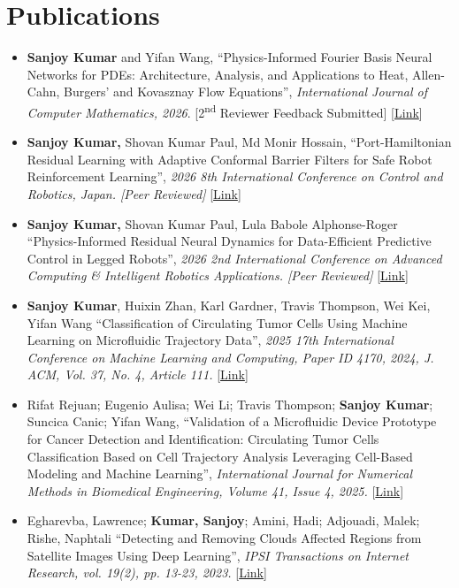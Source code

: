 \documentclass[10pt,letterpaper]{article}
\newcommand{\lk}[2]{[\href{#1}{#2}]}
\begin{document}
\section{Publications}
\begin{itemize}
  \item \textbf{Sanjoy Kumar} and Yifan Wang, ``Physics-Informed Fourier Basis Neural Networks for PDEs: Architecture, Analysis, and Applications to Heat, Allen-Cahn, Burgers' and Kovasznay Flow Equations'', \textit{International Journal of Computer Mathematics, 2026}. [2\textsuperscript{nd} Reviewer Feedback Submitted] \lk{https://drive.google.com/file/d/1UfsILbMxbepeqWYiI7ZbkmEcKGcu33Yc/view?usp=sharing}{Link}
  \item \textbf{Sanjoy Kumar,} Shovan Kumar Paul, Md Monir Hossain, ``Port-Hamiltonian Residual Learning with Adaptive Conformal Barrier Filters for Safe Robot Reinforcement Learning'', \textit{2026 8th International Conference on Control and Robotics, Japan. [Peer Reviewed]} \lk{https://drive.google.com/file/d/1JgQ5MCCtngnDuA6jOblR9TN_yVb0A4v6/view?usp=sharing}{Link}
  \item \textbf{Sanjoy Kumar,} Shovan Kumar Paul, Lula Babole Alphonse-Roger ``Physics-Informed Residual Neural Dynamics for Data-Efficient Predictive Control in Legged Robots'', \textit{2026 2nd International Conference on Advanced Computing \& Intelligent Robotics Applications. [Peer Reviewed]} \lk{https://drive.google.com/file/d/1Eg4A6fNuo_pHqPdSJQX4qJJ0-EjEPrQm/view?usp=sharing}{Link}
  \item \textbf{Sanjoy Kumar}, Huixin Zhan, Karl Gardner, Travis Thompson, Wei Kei, Yifan Wang ``Classification of Circulating Tumor Cells Using Machine Learning on Microfluidic Trajectory Data'', \textit{2025 17th International Conference on Machine Learning and Computing, Paper ID 4170, 2024, J. ACM, Vol. 37, No. 4, Article 111.} \lk{https://link.springer.com/chapter/10.1007/978-3-031-94898-5_34}{Link}
  \item Rifat Rejuan; Eugenio Aulisa; Wei Li; Travis Thompson; \textbf{Sanjoy Kumar}; Suncica Canic; Yifan Wang, ``Validation of a Microfluidic Device Prototype for Cancer Detection and Identification: Circulating Tumor Cells Classification Based on Cell Trajectory Analysis Leveraging Cell-Based Modeling and Machine Learning'', \textit{International Journal for Numerical Methods in Biomedical Engineering, Volume 41, Issue 4, 2025.} \lk{https://doi.org/10.1002/cnm.70037}{Link}
  \item Egharevba, Lawrence; \textbf{Kumar, Sanjoy}; Amini, Hadi; Adjouadi, Malek; Rishe, Naphtali ``Detecting and Removing Clouds Affected Regions from Satellite Images Using Deep Learning'', \textit{IPSI Transactions on Internet Research, vol. 19(2), pp. 13-23, 2023.} \lk{https://doi.org/10.58245/ipsi.tir.2302.03}{Link}

\end{itemize}
\end{document}
